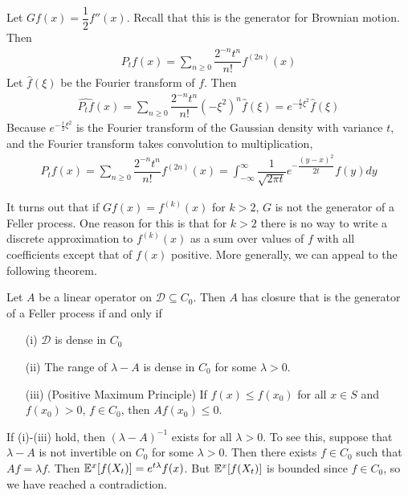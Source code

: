 \documentclass[classnotes]{fillsntsx}
\begin{document}
\begin{exmp}
Let $Gf(x) = \dfrac{1}{2} f''(x)$. Recall that this is the generator for Brownian motion. 
Then 
$$\begin{aligned}
P_t f(x) =  \sum_{n \geq 0} \dfrac{2^{-n}t^{n}}{n!} f^{(2n)}(x) 
\end{aligned}$$
Let $\widehat{f}(\xi)$ be the Fourier transform of $f$. Then
$$\begin{aligned}
\widehat{P_t f}(x) =  \sum_{n \geq 0} \dfrac{2^{-n}t^{n}}{n!} (-\xi^2)^{n} \hat{f}(\xi) = e^{-\frac{t}{2} \xi^2} \widehat{f}(\xi)
\end{aligned}$$
Because $e^{-\frac{t}{2} \xi^2}$ is the Fourier transform of the Gaussian density with variance $t$, and the Fourier transform takes convolution to multiplication,
$$\begin{aligned}
P_t f(x) =  \sum_{n \geq 0} \dfrac{2^{-n}t^{n}}{n!} f^{(2n)}(x) 
= 
\int_{-\infty}^{\infty} \dfrac{1}{\sqrt{ 2 \pi t }} e^{-\dfrac{ (y-x)^2}{2t}} f(y) dy
\end{aligned}$$
\end{exmp}

It turns out that if $Gf(x) = f^{(k)}(x)$ for $k > 2$, $G$ is not the generator of a Feller process.
One reason for this is that for $k > 2$ there is no way to write a discrete approximation to $f^{(k)}(x)$ as a sum over values of $f$ with all coefficients except that of $f(x)$ positive. More generally, we can appeal to the following theorem.

\begin{thm}
Let $A$ be a linear operator on $\mathcal{D} \subseteq C_0$.
Then $A$ has closure that is the generator of a Feller process if and only if
\begin{enumerate}
\item[(i)] $\mathcal{D}$ is dense in $C_0$
\item[(ii)] The range of $\lambda - A$ is dense in $C_0$ for some $\lambda > 0$. 
\item[(iii)] (Positive Maximum Principle) If $f(x) \leq f(x_0)$ for all $x \in S$ and $f(x_0) > 0$, $f \in C_0$, then $A f(x_0) \leq 0$.
\end{enumerate}
\end{thm}

\begin{note}
If (i)-(iii) hold, then $(\lambda - A)^{-1}$ exists for all $\lambda > 0$. To see this, suppose that $\lambda - A$ is not invertible on $C_0$ for some $\lambda > 0$. 
Then there exists $f \in C_0$ such that $Af = \lambda f$. Then $\mathbb{E}^x[f(X_t)] =e^{t \lambda} f(x)$. But $\mathbb{E}^x[f(X_t)]$ is bounded since $f \in C_0$, so we have reached a contradiction. 
\end{note}
\end{document}

